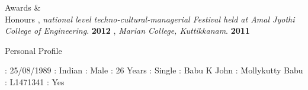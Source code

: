 \documentclass{resume}
\begin{document}

\begin{category}{Awards \&\\ Honours}
  , {\em national level techno-cultural-managerial Festival held at Amal Jyothi College of Engineering}. \hfill \textbf{2012}
  , {\em Marian College, Kuttikkanam}. \hfill \textbf{2011}
  
\end{category}

\begin{category}{Personal Profile}
 
           :   25/08/1989 
             :   Indian 
                  :   Male 
                     :   26 Years 
          :   Single 
           :   Babu K John 
           :   Mollykutty Babu 
         :   L1471341
     :   Yes
\end{category}


\end{document}
